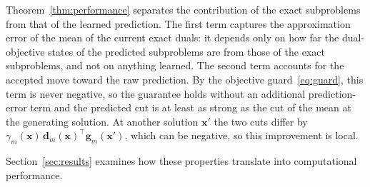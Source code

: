 Theorem~\ref{thm:performance} separates the contribution of the exact subproblems from that of the learned prediction. The first term captures the approximation error of the mean of the current exact duals: it depends only on how far the dual-objective states of the predicted subproblems are from those of the exact subproblems, and not on anything learned. The second term accounts for the accepted move toward the raw prediction. By the objective guard~\eqref{eq:guard}, this term is never negative, so the guarantee holds without an additional prediction-error term and the predicted cut is at least as strong as the cut of the mean at the generating solution. At another solution $\mathbf x'$ the two cuts differ by $\gamma_m(\mathbf x)\,\mathbf d_m(\mathbf x)^\top\mathbf g_m(\mathbf x')$, which can be negative, so this improvement is local.

Section~\ref{sec:results} examines how these properties translate into computational performance.
